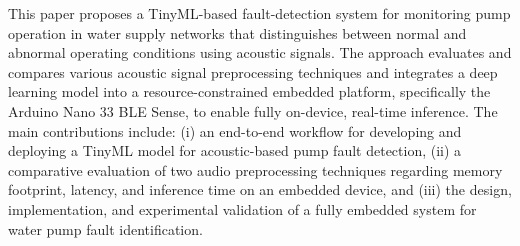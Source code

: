This paper proposes a TinyML-based fault-detection system for monitoring pump operation in water supply networks that distinguishes between normal and abnormal operating conditions using acoustic signals. The approach evaluates and compares various acoustic signal preprocessing techniques and integrates a deep learning model into a resource-constrained embedded platform, specifically the Arduino Nano 33 BLE Sense, to enable fully on-device, real-time inference. The main contributions include: (i) an end-to-end workflow for developing and deploying a TinyML model for acoustic-based pump fault detection, (ii) a comparative evaluation of two audio preprocessing techniques regarding memory footprint, latency, and inference time on an embedded device, and (iii) the design, implementation, and experimental validation of a fully embedded system for water pump fault identification.
